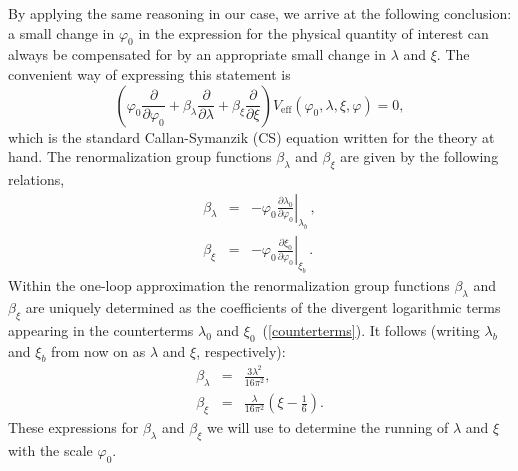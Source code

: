 \documentclass[aps,12pt,superscriptaddress,preprintnumbers,
                secnumarabic,nofootinbib,showpacs]{revtex4}
\begin{document}
By applying the same reasoning in our case, we arrive at the following
conclusion: a small change in $\varphi_0$ in the expression
for the physical quantity of interest can always be compensated for
by an appropriate small change in $\lambda$ and $\xi$. The
convenient way of expressing this statement is
\begin{equation}
\left(\varphi_0\frac{\partial}{\partial\varphi_0} +
\beta_\lambda\frac{\partial}{\partial\lambda} +
\beta_\xi\frac{\partial}{\partial\xi}\right)V_{\mathrm{eff}}(\varphi_0,
\lambda, \xi, \varphi) = 0, \label{callan-symanzik}
\end{equation}
which is the standard Callan-Symanzik (CS) equation written for the
theory at hand. The renormalization group
functions $\beta_\lambda$ and $\beta_\xi$ are given by the
following relations,
\begin{eqnarray}
\beta_\lambda &=&
-\varphi_0\left.\frac{\partial\lambda_0}{\partial\varphi_0}\right|_{\lambda_b}\,,\nonumber\\
\beta_\xi &=&
-\varphi_0\left.\frac{\partial\xi_0}{\partial\varphi_0}\right|_{\xi_b}\,.
\end{eqnarray}
Within the one-loop approximation the renormalization group
functions $\beta_\lambda$ and $\beta_\xi$ are uniquely determined
as the coefficients of the divergent logarithmic terms appearing in
the counterterms $\lambda_0$ and $\xi_0$~(\ref{counterterms}). It
follows (writing $\lambda_b$ and $\xi_b$ from now on as $\lambda$
and $\xi$, respectively):
\begin{eqnarray}
\beta_\lambda & = & \frac{3\lambda^{2}}{16\pi^2},\nonumber\\
\beta_\xi     & = &
\frac{\lambda}{16\pi^2}\left(\xi-\frac16\right).
\label{betafunctionsfinal}
\end{eqnarray}
These expressions for $\beta_\lambda$ and $\beta_\xi$ we will use
to determine the running of $\lambda$ and $\xi$ with the scale $\varphi_0$.
\end{document}
